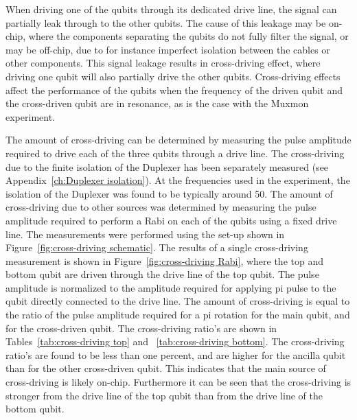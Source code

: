       When driving one of the qubits through its dedicated drive line, the signal can partially leak through to the other qubits. The cause of this leakage may be on-chip, where the components separating the qubits do not fully filter the signal, or may be off-chip, due to for instance imperfect isolation between the cables or other components. This signal leakage results in cross-driving effect, where driving one qubit will also partially drive the other qubits. Cross-driving effects affect the performance of the qubits when the frequency of the driven qubit and the cross-driven qubit are in resonance, as is the case with the Muxmon experiment.

      The amount of cross-driving can be determined by measuring the pulse amplitude required to drive each of the three qubits through a drive line. The cross-driving due to the finite isolation of the Duplexer has been separately measured (see Appendix~\ref{ch:Duplexer isolation}). At the frequencies used in the experiment, the isolation of the Duplexer was found to be typically around \SI{50}{\dBm}. The amount of cross-driving due to other sources was determined by measuring the pulse amplitude required to perform a Rabi on each of the qubits using a fixed drive line. The measurements were performed using the set-up shown in Figure~\ref{fig:cross-driving schematic}. The results of a single cross-driving measurement is shown in Figure~\ref{fig:cross-driving Rabi}, where the top and bottom qubit are driven through the drive line of the top qubit. The pulse amplitude is normalized to the amplitude required for applying pi pulse to the qubit directly connected to the drive line. The amount of cross-driving is equal to the ratio of the pulse amplitude required for a pi rotation for the main qubit, and for the cross-driven qubit. The cross-driving ratio's are shown in Tables~\ref{tab:cross-driving top} and ~\ref{tab:cross-driving bottom}. The cross-driving ratio's are found to be less than one percent, and are higher for the ancilla qubit than for the other cross-driven qubit. This indicates that the main source of cross-driving is likely on-chip. Furthermore it can be seen that the cross-driving is stronger from the drive line of the top qubit than from the drive line of the bottom qubit.

